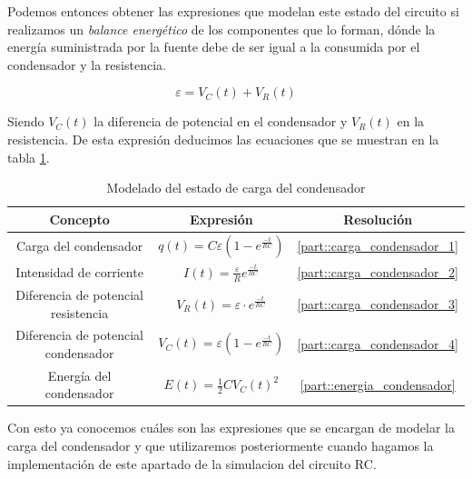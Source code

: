 \documentclass[../main.tex]{subfiles}
\begin{document}
Podemos entonces obtener las expresiones que modelan este estado del circuito si realizamos un \textit{balance energético} de los componentes que lo forman, dónde la energía suministrada por la fuente debe de ser igual a la consumida por el condensador y la resistencia.

\begin{equation}
    \varepsilon = V_C(t) + V_R(t)
    \label{eqq::balance_energetico_rc_1}
\end{equation}

Siendo $V_C(t)$ la diferencia de potencial en el condensador y $V_R(t)$ en la resistencia. De esta expresión deducimos las ecuaciones que se muestran en la tabla \ref{tab::ecuaciones_carga_rc}.

\begin{table}[!ht]
        \begin{center}
            \begin{tabular}{|| c | c | c ||}
                \hline
                \textbf{Concepto} & \textbf{Expresión} &  \textbf{Resolución}\\ \hline
                Carga del condensador & $q(t) = C\varepsilon \left( 1 - e^{\frac{-t}{RC}} \right)$ & \ref{part::carga_condensador_1} \\
                Intensidad de corriente & $I(t) = \frac{\varepsilon}{R}e^{\frac{-t}{RC}}$ & \ref{part::carga_condensador_2} \\
                Diferencia de potencial resistencia & $V_R(t) = \varepsilon \cdot e^{\frac{-t}{RC}}$ & \ref{part::carga_condensador_3} \\ 
                Diferencia de potencial condensador & $V_C(t) = \varepsilon \left(1- e^{\frac{-t}{RC}}\right)$ & \ref{part::carga_condensador_4} \\ 
                Energía del condensador & $E(t) = \frac{1}{2}CV_C(t)^2 $ & \ref{part::energia_condensador}
                \\
                \hline
                \end{tabular}
                \caption{Modelado del estado de carga del condensador}
                \label{tab::ecuaciones_carga_rc}
        \end{center}
    \end{table}
    
Con esto ya conocemos cuáles son las expresiones que se encargan de modelar la carga del condensador y que utilizaremos posteriormente cuando hagamos la implementación de este apartado de la simulacion del circuito RC. \\
\end{document}

